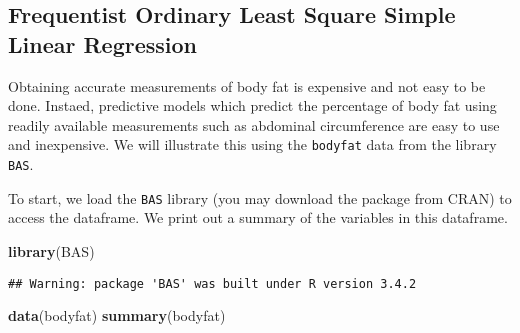 \documentclass[]{book}
\newenvironment{Shaded}{\begin{snugshade}}{\end{snugshade}}
\newcommand{\KeywordTok}[1]{\textcolor[rgb]{0.13,0.29,0.53}{\textbf{#1}}}
\newcommand{\NormalTok}[1]{#1}
\theoremstyle{definition}
\theoremstyle{definition}
\theoremstyle{definition}
\theoremstyle{remark}
\begin{document}
\subsection{Frequentist Ordinary Least Square Simple Linear
Regression}\label{frequentist-ordinary-least-square-simple-linear-regression}

Obtaining accurate measurements of body fat is expensive and not easy to
be done. Instaed, predictive models which predict the percentage of body
fat using readily available measurements such as abdominal circumference
are easy to use and inexpensive. We will illustrate this using the
\texttt{bodyfat} data from the library \texttt{BAS}.

To start, we load the \texttt{BAS} library (you may download the package
from CRAN) to access the dataframe. We print out a summary of the
variables in this dataframe.

\begin{Shaded}
\begin{Highlighting}[]
\KeywordTok{library}\NormalTok{(BAS)}
\end{Highlighting}
\end{Shaded}

\begin{verbatim}
## Warning: package 'BAS' was built under R version 3.4.2
\end{verbatim}

\begin{Shaded}
\begin{Highlighting}[]
\KeywordTok{data}\NormalTok{(bodyfat)}
\KeywordTok{summary}\NormalTok{(bodyfat)}
\end{Highlighting}
\end{Shaded}
\end{document}
